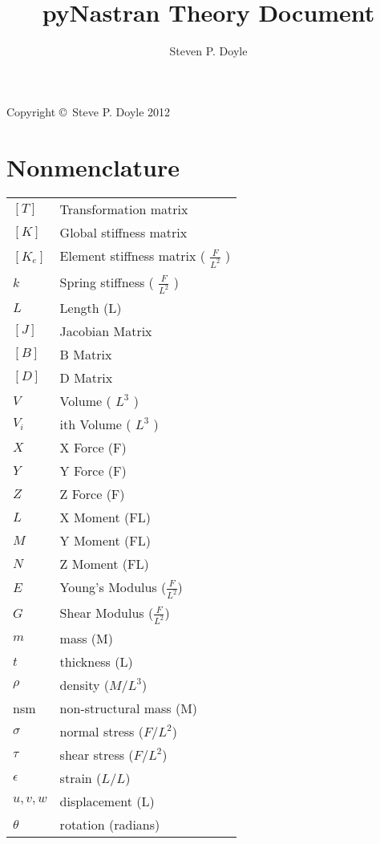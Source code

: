 \documentclass[a4paper,12pt]{article}
\begin{document}
\title{pyNastran Theory Document}
\author{Steven P. Doyle}
\maketitle
Copyright \copyright\ Steve P. Doyle 2012

\tableofcontents

\section{Nonmenclature}

\begin{tabular}{ll}
    $[T]$      & Transformation matrix                \\
    $[K]$      & Global stiffness matrix              \\
    $[K_e]$    & Element stiffness matrix ( $\frac{F}{L^2}$ ) \\
    $k$        & Spring stiffness ( $\frac{F}{L^2}$ ) \\
    $L$        & Length (L)                           \\
    $[J]$      & Jacobian Matrix                      \\
    $[B]$      & B Matrix                             \\
    $[D]$      & D Matrix                             \\
    $V$        & Volume  ( $L^3$ )                    \\
    $V_i$      & ith Volume  ( $L^3$ )                \\
    $X$        & X Force (F)                          \\
    $Y$        & Y Force (F)                          \\
    $Z$        & Z Force (F)                          \\
    $L$        & X Moment (FL)                        \\
    $M$        & Y Moment (FL)                        \\
    $N$        & Z Moment (FL)                        \\
    $E$        & Young's Modulus ($\frac{F}{L^2}$)    \\
    $G$        & Shear Modulus ($\frac{F}{L^2}$)      \\
    $m$        & mass (M)                             \\
    $t$        & thickness (L)                        \\
    $\rho$     & density ($M/L^3$)                    \\
    nsm        & non-structural mass (M)              \\
    $\sigma$   & normal stress ($F/L^2$)              \\
    $\tau$     & shear  stress ($F/L^2$)              \\
    $\epsilon$ & strain ($L/L$)                       \\
    $u,v,w$    & displacement (L)                     \\
    $\theta$   & rotation (radians)
\end {tabular}
\end{document}
